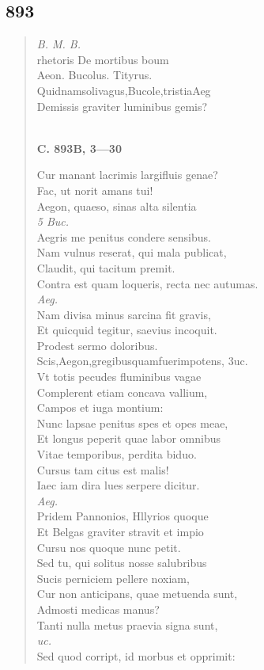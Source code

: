 \documentclass[11pt, a4paper]{report}
\begin{document}
            \subsection*{893}
      \begin{verse}
      \textit{B. M. B.} \\ rhetoris De mortibus boum \\ Aeon. Bucolus. Tityrus. \\ Quidnamsolivagus,Bucole,tristiaAeg \\ Demissis graviter luminibus gemis? \\ 
        ﻿\pagebreak 
    \begin{center} \textbf{C. 893B, 3—30} \end{center} \marginpar{[335]} Cur manant lacrimis largifluis genae? \\ Fac, ut norit amans tui! \\ Aegon, quaeso, sinas alta silentia \\ \textit{5 Buc.} \\ Aegris me penitus condere sensibus. \\ Nam vulnus reserat, qui mala publicat, \\ Claudit, qui tacitum premit. \\ Contra est quam loqueris, recta nec autumas. \\ \textit{Aeg.} \\ Nam divisa minus sarcina fit gravis, \\ Et quicquid tegitur, saevius incoquit. \\ Prodest sermo doloribus. \\ Scis,Aegon,gregibusquamfuerimpotens, \lbrack 3uc. \rbrack  \\ Vt totis pecudes fluminibus vagae \\ Complerent etiam concava vallium, \\ Campos et iuga montium: \\ Nunc lapsae penitus spes et opes meae, \\ Et longus peperit quae labor omnibus \\ Vitae temporibus, perdita biduo. \\ Cursus tam citus est malis! \\ Iaec iam dira lues serpere dicitur. \\ \textit{Aeg.} \\ Pridem Pannonios, Hllyrios quoque \\ Et Belgas graviter stravit et impio \\ Cursu nos quoque nunc petit. \\ Sed tu, qui solitus nosse salubribus \\ Sucis perniciem pellere noxiam, \\ Cur non anticipans, quae metuenda sunt, \\ Admosti medicas manus? \\ Tanti nulla metus praevia signa sunt, \\ \textit{uc.} \\ Sed quod corript, id morbus et opprimit: \\ 

\end{verse}
\end{document}
